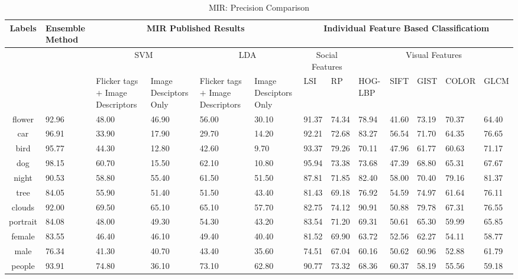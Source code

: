\begin{sidewaystable}
\caption{ MIR: Precision Comparison} %
\vspace*{0.2 cm}
\begin{tabular}{|c|p{1.7cm}| p{1.7cm}| p{1.7cm}| p{1.7cm}|p{1.2cm}| p{1.2cm}|p{1cm}| p{1cm}|p{1cm}| p{1cm}|p{1.4cm}| p{1.2cm}||} \\  [0.5ex] \hline
Labels  & Ensemble Method  &  \multicolumn{4}{c}{MIR Published Results} & \multicolumn{7}{c}{Individual Feature Based Classificatiom}\\  [0.5ex] \hline
  &  &\multicolumn{2}{c}{SVM}	&	\multicolumn{2}{c}{LDA}  & \multicolumn{2}{c}{Social Features}  & \multicolumn{5}{c}{Visual Features}\\  [0.5ex] \hline
  & & Flicker tags $+$ Image Descriptors & Image Desciptors Only	& Flicker tags $+$ Image Descriptors& Image Desciptors Only	& LSI & RP & HOG-LBP & SIFT & GIST & COLOR & GLCM \\  [1ex] \hline
flower & 92.96 & 48.00 & 46.90 & 56.00 & 30.10 & 91.37 & 74.34 & 78.94 & 41.60 & 73.19 & 70.37 & 64.40 \\  [1ex]
car & 96.91 & 33.90 & 17.90 & 29.70 & 14.20 & 92.21 & 72.68 & 83.27 & 56.54 & 71.70 & 64.35 & 76.65 \\  [1ex]
bird & 95.77 & 44.30 & 12.80 & 42.60 & 9.70 & 93.37 & 79.26 & 70.11 & 47.96 & 61.77 & 60.63 & 71.17 \\  [1ex]
dog & 98.15 & 60.70 & 15.50 & 62.10 & 10.80 & 95.94 & 73.38 & 73.68 & 47.39 & 68.80 & 65.31 & 67.67 \\  [1ex]
night & 90.53 & 58.80 & 55.40 & 61.50 & 51.50 & 87.81 & 71.85 & 82.40 & 58.00 & 70.40 & 79.16 & 81.37 \\  [1ex]
tree & 84.05 & 55.90 & 51.40 & 51.50 & 43.40 & 81.43 & 69.18 & 76.92 & 54.59 & 74.97 & 61.64 & 76.11 \\  [1ex]
clouds & 92.00 & 69.50 & 65.10 & 65.10 & 57.70 & 82.75 & 74.12 & 90.91 & 50.88 & 79.78 & 67.31 & 76.55 \\  [1ex]
portrait & 84.08 & 48.00 & 49.30 & 54.30 & 43.20 & 83.54 & 71.20 & 69.31 & 50.61 & 65.30 & 59.99 & 65.85 \\  [1ex]
female & 83.55 & 46.40 & 46.10 & 49.40 & 40.40 & 81.52 & 69.90 & 63.72 & 52.56 & 62.27 & 54.11 & 58.77 \\  [1ex]
male & 76.34 & 41.30 & 40.70 & 43.40 & 35.60 & 74.51 & 67.04 & 60.16 & 50.62 & 60.96 & 52.88 & 61.79 \\  [1ex]
people & 93.91 & 74.80 & 36.10 & 73.10 & 62.80 & 90.77 & 73.32 & 68.36 & 60.37 & 58.19 & 55.56 & 59.18 \\  [1ex]

\end{tabular}
\end{sidewaystable}

